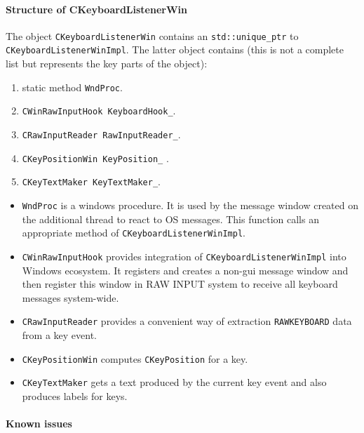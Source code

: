 \documentclass{article}
\begin{document}
\paragraph{Structure of CKeyboardListenerWin}

The object \verb"CKeyboardListenerWin" contains an \verb"std::unique_ptr" to \verb"CKeyboardListenerWinImpl". The latter object contains (this is not a complete list but represents the key parts of the object):
\begin{enumerate}
\item static method \verb"WndProc".
\item \verb"CWinRawInputHook KeyboardHook_".
\item \verb"CRawInputReader RawInputReader_".
\item \verb"CKeyPositionWin KeyPosition_" .
\item \verb"CKeyTextMaker KeyTextMaker_".
\end{enumerate}

\begin{itemize}
\item \verb"WndProc" is a windows procedure. It is used by the message window created on the additional thread to react to OS messages. This function calls an appropriate method of \verb"CKeyboardListenerWinImpl".

\item \verb"CWinRawInputHook" provides integration of \verb"CKeyboardListenerWinImpl" into Windows ecosystem. It registers and creates a non-gui message window and then register this window in RAW INPUT system to receive all keyboard messages system-wide.

\item \verb"CRawInputReader" provides a convenient way of extraction \verb"RAWKEYBOARD" data from a key event.

\item \verb"CKeyPositionWin" computes \verb"CKeyPosition" for a key.

\item \verb"CKeyTextMaker" gets a text produced by the current key event and also produces labels for keys.
\end{itemize}

\paragraph{Known issues}
\end{document}
